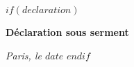 
$if(declaration)$
\cleardoublepage

\thispagestyle{empty}

\vspace*{\fill}

\textbf{Déclaration sous serment}


\vspace{20mm}

\noindent\textit{Paris, le $date$}
$endif$

